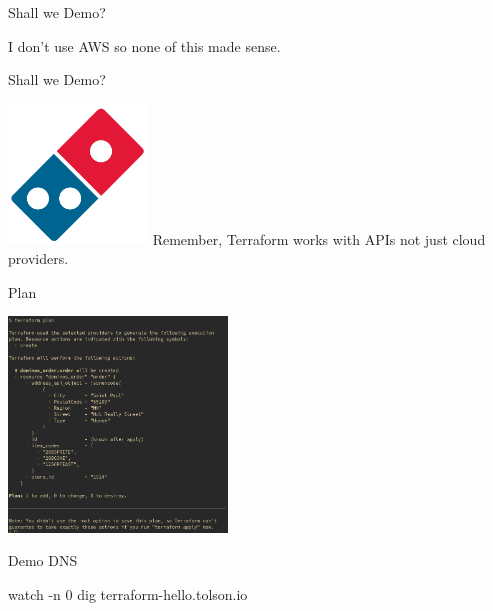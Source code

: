 \documentclass{beamer}
\begin{document}

\begin{frame}{Shall we Demo?}

\begin{center}
I don't use AWS so none of this made sense.
\end{center}

\end{frame}


\begin{frame}{Shall we Demo?}

\begin{center}
    \includegraphics[width=140px,keepaspectratio]{./assets/dominos.png}
    Remember, Terraform works with APIs not just cloud providers.
\end{center}

\end{frame}


\begin{frame}[fragile]{Plan}

\begin{center}
    \includegraphics[width=220px,keepaspectratio]{./assets/plan.png}
\end{center}

\end{frame}


\begin{frame}[fragile]{Demo DNS}

\begin{semiverbatim}
watch -n 0 dig terraform-hello.tolson.io
\end{semiverbatim}

\end{frame}
\end{document}
